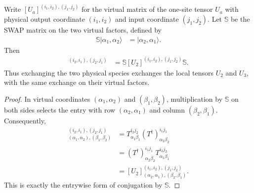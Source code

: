 \begin{lemma}
    \label{thm:threeMPU_local_physical_swap}
    \leanok
    Write $[U_a]^{(i_1,i_2),(j_1,j_2)}$ for the virtual matrix of the
    one-site tensor $U_a$ with physical output coordinate $(i_1,i_2)$ and
    input coordinate $(j_1,j_2)$. Let $\mathbb S$ be the SWAP matrix on the
    two virtual factors, defined by
    \begin{align}
        \mathbb S\lvert\alpha_1,\alpha_2\rangle
         & =\lvert\alpha_2,\alpha_1\rangle.
    \end{align}
    Then
    \begin{align}
        [U_3]^{(i_2,i_1),(j_2,j_1)}
         & =\mathbb S[U_2]^{(i_1,i_2),(j_1,j_2)}\mathbb S.
    \end{align}
    Thus exchanging the two physical species exchanges the local tensors
    $U_2$ and $U_3$, with the same exchange on their virtual factors.
\end{lemma}

\begin{proof}\leanok
    In virtual coordinates $(\alpha_1,\alpha_2)$ and
    $(\beta_1,\beta_2)$, multiplication by $\mathbb S$ on both sides selects
    the entry with row $(\alpha_2,\alpha_1)$ and column
    $(\beta_2,\beta_1)$. Consequently,
    \begin{align}
        [U_3]^{(i_2,i_1),(j_2,j_1)}_{(\alpha_1,\alpha_2),(\beta_1,\beta_2)}
         & =T^{i_2j_2}_{\alpha_1\beta_1}
        (T^\dagger)^{i_1j_1}_{\alpha_2\beta_2}                                   \\
         & =(T^\dagger)^{i_1j_1}_{\alpha_2\beta_2}
        T^{i_2j_2}_{\alpha_1\beta_1}                                             \\
         & =[U_2]^{(i_1,i_2),(j_1,j_2)}_{(\alpha_2,\alpha_1),(\beta_2,\beta_1)}.
    \end{align}
    This is exactly the entrywise form of conjugation by $\mathbb S$.
\end{proof}

